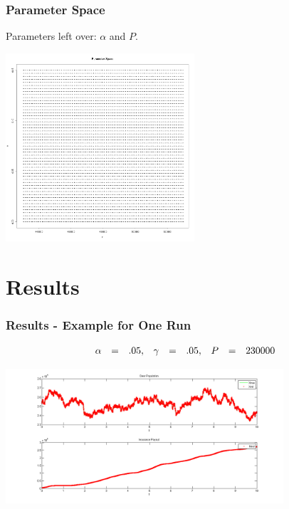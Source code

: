 \documentclass{beamer}   %
\begin{document}
\begin{frame}
  \frametitle{Parameter Space}

  Parameters left over: $\alpha$ and $P$. 

  
  \centerline{\includegraphics[height=7cm]{fullParameters}}

\end{frame}



\section{Results}

\begin{frame}
  \frametitle{Results - Example for One Run}
  \vspace*{-1cm}
  \begin{eqnarray*}
    \begin{array}{r c l r c l r c l}
      \alpha &=& .05, & \gamma &=& .05, & P &=& 230000
    \end{array}
  \end{eqnarray*}
  \hspace*{-2cm}
  \centerline{\includegraphics[height=5cm]{deerins}}
\end{frame}
\end{document}
